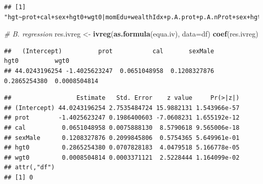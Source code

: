 \documentclass[
]{book}
\newenvironment{Shaded}{\begin{snugshade}}{\end{snugshade}}
\newcommand{\CommentTok}[1]{\textcolor[rgb]{0.56,0.35,0.01}{\textit{#1}}}
\newcommand{\DataTypeTok}[1]{\textcolor[rgb]{0.13,0.29,0.53}{#1}}
\newcommand{\KeywordTok}[1]{\textcolor[rgb]{0.13,0.29,0.53}{\textbf{#1}}}
\newcommand{\NormalTok}[1]{#1}
\newcommand{\OperatorTok}[1]{\textcolor[rgb]{0.81,0.36,0.00}{\textbf{#1}}}
\newcommand{\OtherTok}[1]{\textcolor[rgb]{0.56,0.35,0.01}{#1}}
\newcommand{\StringTok}[1]{\textcolor[rgb]{0.31,0.60,0.02}{#1}}
\begin{document}
\begin{verbatim}
## [1] "hgt~prot+cal+sex+hgt0+wgt0|momEdu+wealthIdx+p.A.prot+p.A.nProt+sex+hgt0+wgt0"
\end{verbatim}

\begin{Shaded}
\begin{Highlighting}[]
\CommentTok{# B. regression}
\NormalTok{res.ivreg <-}\StringTok{ }\KeywordTok{ivreg}\NormalTok{(}\KeywordTok{as.formula}\NormalTok{(equa.iv), }\DataTypeTok{data=}\NormalTok{df)}
\KeywordTok{coef}\NormalTok{(res.ivreg)}
\end{Highlighting}
\end{Shaded}

\begin{verbatim}
##   (Intercept)          prot           cal       sexMale          hgt0          wgt0 
## 44.0243196254 -1.4025623247  0.0651048958  0.1208327876  0.2865254380  0.0008504814
\end{verbatim}

\begin{Shaded}
\end{Shaded}

\begin{verbatim}
##                  Estimate   Std. Error    z value     Pr(>|z|)
## (Intercept) 44.0243196254 2.7535484724 15.9882131 1.543966e-57
## prot        -1.4025623247 0.1986400603 -7.0608231 1.655192e-12
## cal          0.0651048958 0.0075888130  8.5790618 9.565006e-18
## sexMale      0.1208327876 0.2099845806  0.5754365 5.649961e-01
## hgt0         0.2865254380 0.0707828183  4.0479518 5.166778e-05
## wgt0         0.0008504814 0.0003371121  2.5228444 1.164099e-02
## attr(,"df")
## [1] 0
\end{verbatim}

\begin{Shaded}
\end{Shaded}
\end{document}
